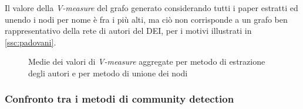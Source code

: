 \documentclass[12pt,a4paper,twoside]{report}
\begin{document}
Il valore della \textit{V-measure} del grafo generato considerando tutti i paper estratti ed unendo
i nodi per nome è fra i più alti, ma ciò non corrisponde a un grafo ben rappresentativo della rete
di autori del DEI, per i motivi illustrati in \ref{ssc:padovani}.

\begin{figure}[H]
    \begin{minipage}[c]{0.60\textwidth}
    \setlength{\fboxrule}{0pt}	%
    \end{minipage}
    \begin{minipage}[c]{0.32\textwidth}
    \caption{Medie dei valori di \textit{V-measure} aggregate per metodo di estrazione degli autori
        e per metodo di unione dei nodi}
    \label{img:vmeasureestrazione}
    \end{minipage}
\end{figure}



\subsubsection{Confronto tra i metodi di community detection}
\end{document}
